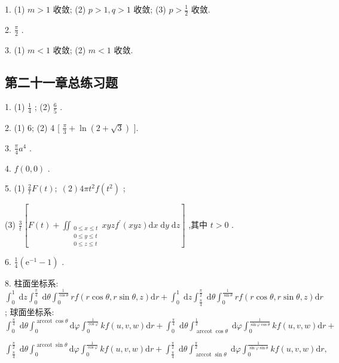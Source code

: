 1. (1) \(m > 1\) 收敛; (2) \(p > 1,q > 1\) 收敛; (3) \(p > \frac{1}{2}\) 收敛.

2. \(\frac{\pi }{2}\) .

3. (1) \(m < 1\) 收敛; (2) \(m < 1\) 收敛.

\subsection{第二十一章总练习题}

1. (1) \(\frac{1}{4}\) ; (2) \(\frac{6}{5}\) .

2. (1) 6; (2) 4 [ \(\frac{\pi }{3} + \ln \left( {2 + \sqrt{3}}\right)\) ].

3. \(\frac{\pi }{4}{a}^{4}\) .

4. \(f\left( {0,0}\right)\) .

5. (1) \(\frac{2}{t}F\left( t\right) ;\;\left( 2\right) {4\pi }{t}^{2}f\left( {t}^{2}\right)\) ;

(3) \(\frac{3}{t}\left\lbrack  {F\left( t\right)  + {\iint }_{\begin{matrix} {0 \leq  x \leq  t} \\  {0 \leq  y \leq  t} \\  {0 \leq  z \leq  t} \end{matrix}}{xyz}{f}^{\prime }\left( {xyz}\right) \mathrm{d}x\mathrm{\;d}y\mathrm{\;d}z}\right\rbrack\) ,其中 \(t > 0\) .

6. \(\frac{1}{4}\left( {{\mathrm{e}}^{-1} - 1}\right)\) .

8. 柱面坐标系: \({\int }_{0}^{1}\mathrm{\;d}z{\int }_{0}^{\frac{\pi }{4}}\mathrm{\;d}\theta {\int }_{0}^{\frac{1}{\cos \theta }}{rf}\left( {r\cos \theta ,r\sin \theta ,z}\right) \mathrm{d}r + {\int }_{0}^{1}\mathrm{\;d}z{\int }_{\frac{\pi }{4}}^{\frac{\pi }{2}}\mathrm{\;d}\theta {\int }_{0}^{\frac{1}{\sin \theta }}{rf}\left( {r\cos \theta ,r\sin \theta ,z}\right) \mathrm{d}r\) ; 球面坐标系: \({\int }_{0}^{\frac{\pi }{4}}\mathrm{\;d}\theta {\int }_{0}^{\operatorname{arccot}\cos \theta }\mathrm{d}\varphi {\int }_{0}^{\frac{1}{\cos \varphi }}{kf}\left( {u,v,w}\right) \mathrm{d}r + {\int }_{0}^{\frac{\pi }{4}}\mathrm{\;d}\theta {\int }_{\operatorname{arccot}\cos \theta }^{\frac{1}{2}}\mathrm{\;d}\varphi {\int }_{0}^{\frac{1}{\sin \varphi \cos \theta }}{kf}\left( {u,v,w}\right) \mathrm{d}r +\)

\({\int }_{\frac{\pi }{4}}^{\frac{\pi }{2}}\mathrm{\;d}\theta {\int }_{0}^{\operatorname{arccot}\sin \theta }\mathrm{d}\varphi {\int }_{0}^{\frac{1}{\cos \varphi }}{kf}\left( {u,v,w}\right) \mathrm{d}r + {\int }_{\frac{\pi }{4}}^{\frac{\pi }{2}}\mathrm{\;d}\theta {\int }_{\operatorname{arccot}\sin \theta }^{\frac{\pi }{2}}\mathrm{\;d}\varphi {\int }_{0}^{\frac{1}{\sin \varphi \sin \theta }}{kf}\left( {u,v,w}\right) \mathrm{d}r,\)


